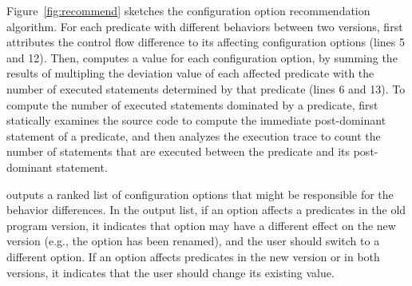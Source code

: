 Figure~\ref{fig:recommend} sketches the configuration option
recommendation algorithm.
For each predicate with different behaviors between two
versions, \ourtool first attributes the control flow difference 
to its affecting configuration options (lines 5 and 12). Then,
\ourtool computes a value for each configuration option, by summing
the results of multipling the deviation value of each affected
predicate with the number of
executed statements determined by that predicate (lines 6 and 13).
To compute the number of executed statements dominated by a predicate,
\ourtool first statically examines the source code to compute
the immediate post-dominant statement of a predicate, and then
analyzes the execution trace to count the number of statements that
are executed between the predicate and its post-dominant
statement. 


\ourtool outputs a ranked list of
configuration options that might be responsible for the
behavior differences. In the output list, if an option affects 
a predicates in the old program version,
it indicates that option may have a different effect on the new
version (e.g., the option has
been renamed), and the user should switch to a different option.
If an option affects predicates in the new version or in both
versions, it indicates that the user should change its
existing value.







